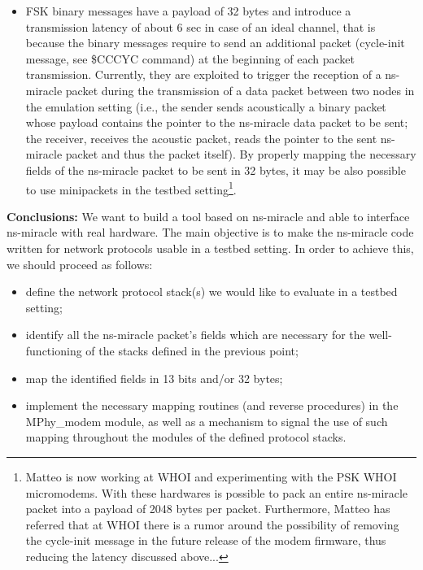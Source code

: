 \documentclass[11pt,journal,draftclsnofoot,onecolumn,twoside,letterpaper]{IEEEtran}
\theoremstyle{definition} \newtheorem{definition}[]{Definition}
\theoremstyle{theorem} \newtheorem{theorem}[]{Theorem}
\begin{document}
\begin{itemize}
 \item  FSK binary messages have a payload of 32 bytes and introduce a transmission latency of about 6 sec in case of an ideal channel, that is because the binary messages require to send an additional packet (cycle-init message, see \$CCCYC command) at the beginning of each packet transmission. Currently, they are exploited to trigger the reception of a ns-miracle packet during the transmission of a data packet between two nodes in the emulation setting (i.e., the sender sends acoustically a binary packet whose payload contains the pointer to the ns-miracle data packet to be sent; the receiver, receives the acoustic packet, reads the pointer to the sent ns-miracle packet and thus the packet itself). By properly mapping the necessary fields of the ns-miracle packet to be sent in 32 bytes, it may be also possible to use minipackets in the testbed setting\footnote{Matteo is now working at WHOI and experimenting with the PSK WHOI micromodems. With these hardwares is possible to pack an entire ns-miracle packet into a payload of 2048 bytes per packet. Furthermore, Matteo has referred that at WHOI there is a rumor around the possibility of removing the cycle-init message in the future release of the modem firmware, thus reducing the latency discussed above...}. 
\end{itemize}
{\bf Conclusions:}
We want to build a tool based on ns-miracle and able to interface ns-miracle with real hardware. The main objective is to make the ns-miracle code written for network protocols usable in a testbed setting. In order to achieve this, we should proceed as follows:
\begin{itemize}
 \item define the network protocol stack(s) we would like to evaluate in a testbed setting; 
 \item identify all the ns-miracle packet's fields which are necessary for the well-functioning of the stacks defined in the previous point;
 \item map the identified fields in 13 bits and/or 32 bytes;
 \item implement the necessary mapping routines (and reverse procedures) in the MPhy\_modem module, as well as a mechanism to signal the use of such mapping throughout the modules of the defined protocol stacks.   
\end{itemize}

\end{document}
